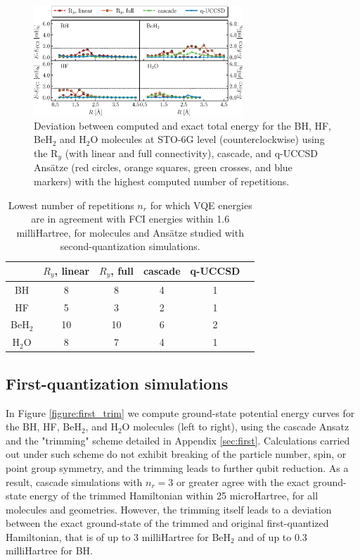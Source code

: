 \documentclass[aps,pra,onecolumn]{revtex4-2}
\newcommand{\ry}{R_y}
\begin{document}
\begin{figure}[t!]
\includegraphics[width=0.7\textwidth]{../figures/second_quantization_comparison/second_quantization_comparison.eps}
\caption{Deviation between computed and exact total energy for the BH, HF, BeH$_2$ and H$_2$O molecules at STO-6G level 
(counterclockwise) using the R$_y$ (with linear and full connectivity), cascade, and q-UCCSD Ans\"{a}tze 
(red circles, orange squares, green crosses, and blue markers) with the highest computed number of repetitions.
}
\label{figure:second_comparison}
\end{figure} 

\begin{table}[t!]
\begin{tabular}{c|ccccc}
\hline\hline
& $\ry$, linear & $\ry$, full & cascade & q-UCCSD \\
\hline
BH & 8 & 8 & 4 & 1 \\
HF & 5 & 3 & 2 & 1 \\
BeH$_2$ & 10 & 10 & 6 & 2 \\
H$_2$O & 8 & 7 & 4 & 1 \\
\hline\hline
\end{tabular}
\caption{Lowest number of repetitions $n_r$ for which VQE energies are in agreement with FCI energies within 1.6 milliHartree, for molecules and Ans\"{a}tze studied with second-quantization simulations.}
\label{table:nr_comparison}
\end{table}

\subsection{First-quantization simulations}

In Figure \ref{figure:first_trim} we compute ground-state potential energy curves for the BH, HF, BeH$_2$, and H$_2$O molecules (left to right), using the cascade Ansatz
and the "trimming" scheme detailed in Appendix \ref{sec:first}.
Calculations carried out under such scheme do not exhibit breaking of the particle number, spin, or point group symmetry, and the trimming leads to further qubit reduction.
As a result, cascade simulations with $n_r=3$ or greater agree with the exact ground-state energy of the trimmed Hamiltonian within 25 microHartree, for all molecules and geometries.
However, the trimming itself leads to a deviation between the exact ground-state of the trimmed and original first-quantized Hamiltonian, that is of up to 3 milliHartree for BeH$_2$
and of up to 0.3 milliHartree for BH.
\end{document}
